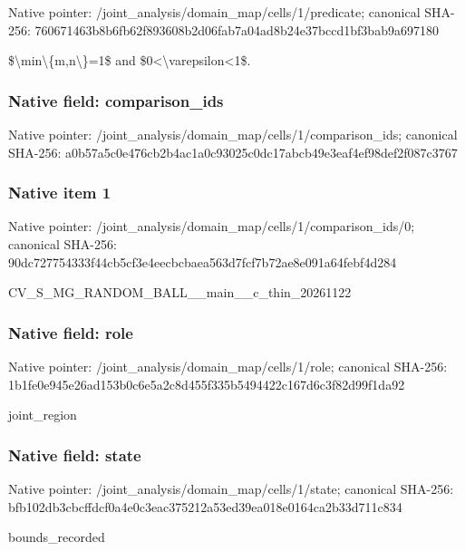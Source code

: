 \documentclass[10pt,a4paper]{article}
\begin{document}
Native pointer: /joint\_analysis/domain\_m\allowbreak{}ap/cells/1/predicate; canonical SHA-256: 760671463b8b6fb62f893608\allowbreak{}b2d06fab7a04ad8b24e37bcc\allowbreak{}d1bf3bab9a697180


\$\textbackslash{}min\textbackslash{}\{m,n\textbackslash{}\}=1\$ and \$0<\textbackslash{}varepsilon<1\$.


\subsubsection{Native field: comparison\_ids}


Native pointer: /joint\_analysis/domain\_m\allowbreak{}ap/cells/1/comparison\_id\allowbreak{}s; canonical SHA-256: a0b57a5c0e476cb2b4ac1a0c\allowbreak{}93025c0dc17abcb49e3eaf4e\allowbreak{}f98def2f087c3767



\subsubsection{Native item 1}


Native pointer: /joint\_analysis/domain\_m\allowbreak{}ap/cells/1/comparison\_id\allowbreak{}s/0; canonical SHA-256: 90dc727754333f44cb5cf3e4\allowbreak{}eecbcbaea563d7fcf7b72ae8\allowbreak{}e091a64febf4d284


CV\_S\_MG\_RANDOM\_BALL\_\_mai\allowbreak{}n\_\_c\_thin\_20261122


\subsubsection{Native field: role}


Native pointer: /joint\_analysis/domain\_map/cells/1/role; canonical SHA-256: 1b1fe0e945e26ad153b0c6e5\allowbreak{}a2c8d455f335b5494422c167\allowbreak{}d6c3f82d99f1da92


joint\_region


\subsubsection{Native field: state}


Native pointer: /joint\_analysis/domain\_m\allowbreak{}ap/cells/1/state; canonical SHA-256: bfb102db3cbcffdcf0a4e0c3\allowbreak{}eac375212a53ed39ea018e01\allowbreak{}64ca2b33d711c834


bounds\_recorded
\end{document}
